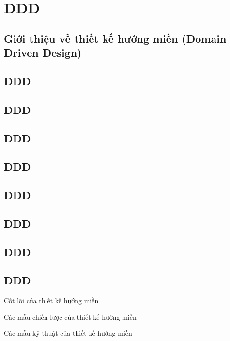 \chapter{DDD}
\section{Giới thiệu về thiết kế hướng miền (Domain Driven Design)}
\section{DDD}
\section{DDD}
\section{DDD}
\section{DDD}
\section{DDD}
\section{DDD}
\section{DDD}
\section{DDD}



Cốt lõi của thiết kế hướng miền


% 

Các mẫu chiến lược của thiết kế hướng miền

Các mẫu kỹ thuật của thiết kế hướng miền

% 


